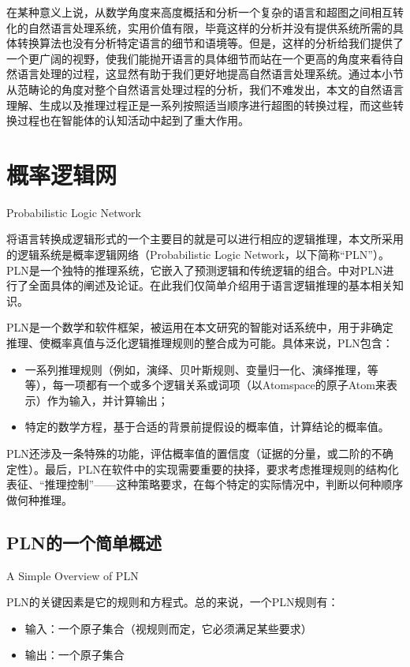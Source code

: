 在某种意义上说，从数学角度来高度概括和分析一个复杂的语言和超图之间相互转化的自然语言处理系统，实用价值有限，毕竟这样的分析并没有提供系统所需的具体转换算法也没有分析特定语言的细节和语境等。但是，这样的分析给我们提供了一个更广阔的视野，使我们能抛开语言的具体细节而站在一个更高的角度来看待自然语言处理的过程，这显然有助于我们更好地提高自然语言处理系统。通过本小节从范畴论的角度对整个自然语言处理过程的分析，我们不难发出，本文的自然语言理解、生成以及推理过程正是一系列按照适当顺序进行超图的转换过程，而这些转换过程也在智能体的认知活动中起到了重大作用。

\section{概率逻辑网}{Probabilistic Logic Network }
\label{sec:pln}

将语言转换成逻辑形式的一个主要目的就是可以进行相应的逻辑推理，本文所采用的逻辑系统是概率逻辑网络（Probabilistic Logic Network，以下简称“PLN”）。 PLN是一个独特的推理系统，它嵌入了预测逻辑和传统逻辑的组合。\cite{Goertzel2008, RWR}中对PLN进行了全面具体的阐述及论证。在此我们仅简单介绍用于语言逻辑推理的基本相关知识。

PLN是一个数学和软件框架，被运用在本文研究的智能对话系统中，用于非确定推理、使概率真值与泛化逻辑推理规则的整合成为可能。具体来说，PLN包含：

\begin{itemize}
\item 一系列推理规则（例如，演绎、贝叶斯规则、变量归一化、演绎推理，等等），每一项都有一个或多个逻辑关系或词项（以Atomspace的原子Atom来表示）作为输入，并计算输出；
\item 特定的数学方程，基于合适的背景前提假设的概率值，计算结论的概率值。
\end{itemize}
PLN还涉及一条特殊的功能，评估概率值的置信度（证据的分量，或二阶的不确定性）。最后，PLN在软件中的实现需要重要的抉择，要求考虑推理规则的结构化表征、“推理控制”——这种策略要求，在每个特定的实际情况中，判断以何种顺序做何种推理。

\subsection{PLN的一个简单概述}{A Simple Overview of PLN}

PLN的关键因素是它的规则和方程式。总的来说，一个PLN规则有：

\begin{itemize}
\item 输入：一个原子集合（视规则而定，它必须满足某些要求）
\item 输出：一个原子集合
\end{itemize}

